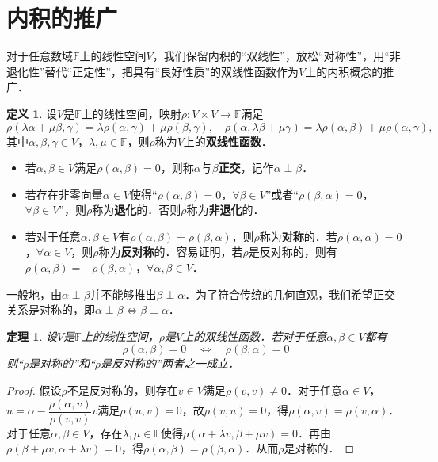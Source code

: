 \documentclass[a4paper,fontset=windows]{ctexbook}
\newtheorem{theorem}{定理}[chapter]
\theoremstyle{definition}
\newtheorem{definition}{定义}[chapter]
\begin{document}
\clearpage\section{内积的推广}

对于任意数域$\mathbb{F}$上的线性空间$V$，我们保留内积的“双线性”，放松“对称性”，用“非退化性”替代“正定性”，把具有“良好性质”的双线性函数作为$V$上的内积概念的推广．

\begin{definition}
设$V$是$\mathbb{F}$上的线性空间，映射$\rho:V\times V\to\mathbb{F}$满足
$$\rho(\lambda\alpha+\mu\beta,\gamma)=\lambda\rho(\alpha,\gamma)+\mu\rho(\beta,\gamma),\quad\rho(\alpha,\lambda\beta+\mu\gamma)=\lambda\rho(\alpha,\beta)+\mu\rho(\alpha,\gamma),$$
其中$\alpha,\beta,\gamma\in V$，$\lambda,\mu\in\mathbb{F}$，则$\rho$称为$V$上的{\bf 双线性函数}．
\begin{itemize}
\item 若$\alpha,\beta\in V$满足$\rho(\alpha,\beta)=0$，则称$\alpha$与$\beta${\bf 正交}，记作$\alpha\perp\beta$．

\item 若存在非零向量$\alpha\in V$使得“$\rho(\alpha,\beta)=0$，$\forall\beta\in V$”或者“$\rho(\beta,\alpha)=0$，$\forall\beta\in V$”，则$\rho$称为{\bf 退化}的．否则$\rho$称为{\bf 非退化}的．

\item 若对于任意$\alpha,\beta\in V$有$\rho(\alpha,\beta)=\rho(\beta,\alpha)$，则$\rho$称为{\bf 对称}的．若$\rho(\alpha,\alpha)=0$，$\forall\alpha\in V$，则$\rho$称为{\bf 反对称}的．容易证明，若$\rho$是反对称的，则有$\rho(\alpha,\beta)=-\rho(\beta,\alpha)$，$\forall\alpha,\beta\in V$．
\end{itemize}
\end{definition}

一般地，由$\alpha\perp\beta$并不能够推出$\beta\perp\alpha$．为了符合传统的几何直观，我们希望正交关系是对称的，即$\alpha\perp\beta\Leftrightarrow\beta\perp\alpha$．

\begin{theorem}
设$V$是$\mathbb{F}$上的线性空间，$\rho$是$V$上的双线性函数．若对于任意$\alpha,\beta\in V$都有
$$\rho(\alpha,\beta)=0\quad\Leftrightarrow\quad\rho(\beta,\alpha)=0$$
则“$\rho$是对称的”和“$\rho$是反对称的”两者之一成立．
\end{theorem}

\begin{proof}
假设$\rho$不是反对称的，则存在$v\in V$满足$\rho(v,v)\ne 0$．对于任意$\alpha\in V$，$u=\alpha-\dfrac{\rho(\alpha,v)}{\rho(v,v)}v$满足$\rho(u,v)=0$，故$\rho(v,u)=0$，得$\rho(\alpha,v)=\rho(v,\alpha)$．对于任意$\alpha,\beta\in V$，存在$\lambda,\mu\in\mathbb{F}$使得$\rho(\alpha+\lambda v,\beta+\mu v)=0$．再由$\rho(\beta+\mu v,\alpha+\lambda v)=0$，得$\rho(\alpha,\beta)=\rho(\beta,\alpha)$．从而$\rho$是对称的．
\end{proof}
\end{document}
